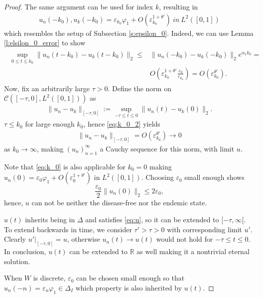 \documentclass{article}
\newcommand{\1}[1]{{\mathds{1}}_{\left\{#1\right\}}}
\begin{document}
\begin{proof}
	
	The same argument can be used for index $k$, resulting in
	\begin{align}
		\label{eq:k_0}
		u_n(-k_0),u_{k}(-k_0)=\varepsilon_{k_0}\varphi_1+O\left( \varepsilon_{k_0}^{1+\theta'} \right) \ \textit{in} \ L^{2}([0,1])
	\end{align}
	which resembles the setup of Subsection \ref{s:epsilon_0}. Indeed, we can use Lemma \ref{l:elsilon_0_error} to show
	\begin{align}
		\label{eq:k_0_2}
		\begin{split}
		\sup_{0 \leq t \leq k_0}\|u_n(t-k_0)-u_k(t-k_0) \|_2  \leq& \|u_n(-k_0)-u_{k}(-k_0) \|_2e^{\alpha_1 k_0}=\\
		&O \left(\varepsilon_{k_0}^{1+\theta'} \frac{\varepsilon_0}{\varepsilon_{k_0}}\right)=O\left(\varepsilon_{k_0}^{\theta'} \right).
		\end{split}
	\end{align}
	Now, fix an arbitrarily large $\tau>0.$  Define the norm on $\mathcal{C}\left([-\tau,0], L^2([0,1]) \right)$ as
	\begin{align*}
		\|u_n-u_k \|_{[-\tau,0]}:=\sup_{-\tau \leq t \leq 0 } \|u_n(t)-u_k(0) \|_2.
	\end{align*}
	$\tau \leq  k_0$ for large enough $k_0$, hence \eqref{eq:k_0_2} yields
	\begin{align}
		\label{eq:Cauchy}
		\|u_n-u_k \|_{[-\tau,0]}=O\left(\varepsilon_{k_0}^{\theta'} \right) \to 0
	\end{align}
	as $k_0\to\infty$, making $(u_n)_{n=1}^{\infty}$ a Cauchy sequence for this norm, with limit $u$.
	
	Note that \eqref{eq:k_0} is also applicable for $k_0=0$ making $u_n(0)=\varepsilon_0 \varphi_1+O\left(\varepsilon_{0}^{1+\theta'} \right)$ in $L^2([0,1]).$ Choosing $\varepsilon_0$ small enough shows
	$$\frac{\varepsilon_0}{2} \|u_n(0) \|_2 \leq 2 \varepsilon_0, $$
	hence, $u$ can not be neither the disease-free nor the endemic state.
	
	$u(t)$ inherits being in $\Delta$ and satisfies \eqref{eq:u}, so it can be extended to $[-\tau, \infty[.$ To extend backwards in time, we consider $\tau'>\tau>0$ with corresponding limit $u'.$ Clearly $\left.u' \right|_{[-\tau,0]}=u$, otherwise $u_n(t) \to u(t) $ would not hold for $-\tau \leq t \leq 0.$ In conclusion, $u(t)$ can be extended to $\mathbb{R}$ as well making it a nontrivial eternal solution.
	
	When $W$ is discrete, $\varepsilon_0$ can be chosen small enough so that $u_n(-n)=\varepsilon_n \varphi_1 \in \Delta_I$ which property is also inherited by $u(t)$.
	

\end{proof}
\end{document}
